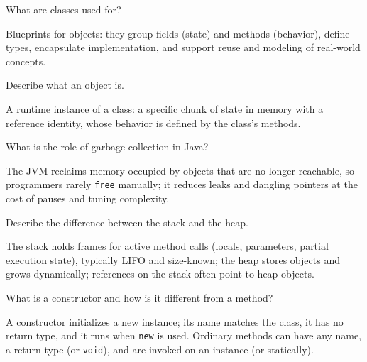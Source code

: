 


\question[4]
What are classes used for?
\begin{solutionorbox}[1.2in]
  Blueprints for objects: they group fields (state) and methods (behavior), define types, encapsulate implementation, and support reuse and modeling of real-world concepts.
\end{solutionorbox}

\question[4]
Describe what an object is.
\begin{solutionorbox}[1.15in]
  A runtime instance of a class: a specific chunk of state in memory with a reference identity, whose behavior is defined by the class's methods.
\end{solutionorbox}

\question[4]
What is the role of garbage collection in Java?
\begin{solutionorbox}[1.2in]
  The JVM reclaims memory occupied by objects that are no longer reachable, so programmers rarely \texttt{free} manually; it reduces leaks and dangling pointers at the cost of pauses and tuning complexity.
\end{solutionorbox}

\question[4]
Describe the difference between the stack and the heap.
\begin{solutionorbox}[1.45in]
  The stack holds frames for active method calls (locals, parameters, partial execution state), typically LIFO and size-known; the heap stores objects and grows dynamically; references on the stack often point to heap objects.
\end{solutionorbox}

\question[4]
What is a constructor and how is it different from a method?
\begin{solutionorbox}[1.35in]
  A constructor initializes a new instance; its name matches the class, it has no return type, and it runs when \texttt{new} is used. Ordinary methods can have any name, a return type (or \texttt{void}), and are invoked on an instance (or statically).
\end{solutionorbox}

